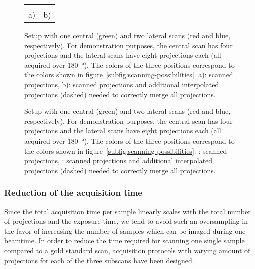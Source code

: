 \ifiucr
	\begin{figure}%
		\caption{Setup with one central (green) and two lateral scans (red and blue, respectively). For demonstration purposes, the central scan has four projections and the lateral scans have eight projections each (all acquired over \SI{180}{\degree}). The colors of the three positions correspond to the colors shown in figure~\ref{subfig:scanning-possibilities}. a): scanned projections, b): scanned projections and additional interpolated projections (dashed) needed to correctly merge all projections.}%
		\begin{tabular}{cc}%
			\label{subfig:ProjectionSetup}%
		&%
			\label{subfig:ProjectionSetupInterpolate}%
		\\%
		a) & b)\\%
		\end{tabular}%
		\label{fig:projections}%
	\end{figure}%
\else
	\begin{figure*}[htp]
		\centering
		\subfloat[]{%
			\label{subfig:ProjectionSetup}%
			}%
		\subfloat[]{%
			\label{subfig:ProjectionSetupInterpolate}%
			}%
		\caption{Setup with one central (green) and two lateral scans (red and blue, respectively). For demonstration purposes, the central scan has four projections and the lateral scans have eight projections each (all acquired over \SI{180}{\degree}). The colors of the three positions correspond to the colors shown in figure~\ref{subfig:scanning-possibilities}. : scanned projections, : scanned projections and additional interpolated projections (dashed) needed to correctly merge all projections.}
		\label{fig:projections}
	\end{figure*}
\fi

\subsubsection{Reduction of the acquisition time}%
Since the total acquisition time per sample linearly scales with the total number of projections and the exposure time, we tend to avoid such an oversampling in the favor of increasing the number of samples which can be imaged during one beamtime. In order to reduce the time required for scanning one single sample compared to a gold standard scan, acquisition protocols with varying amount of projections for each of the three subscans have been designed.

